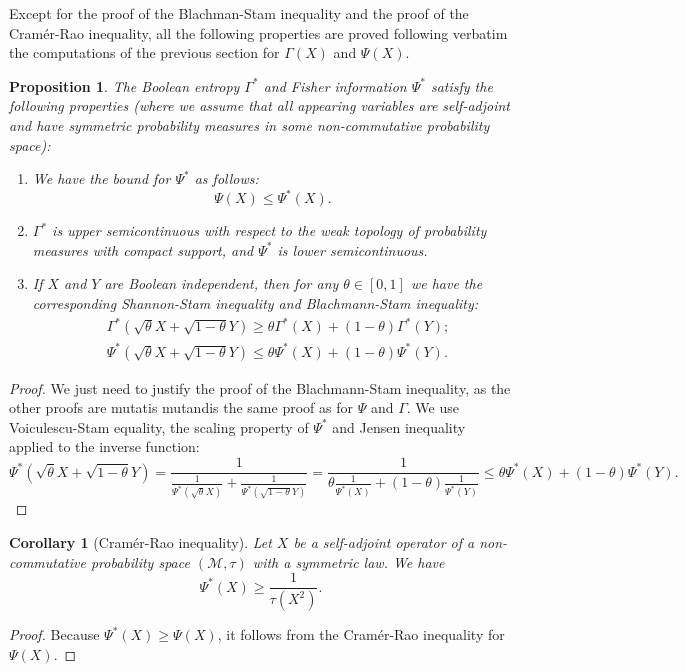 \documentclass[10pt, reqno]{amsart}
\numberwithin{equation}{section}
\theoremstyle{definition}
\theoremstyle{plain}
\newtheorem{proposition}[definition]{Proposition}
\newtheorem{corollary}[definition]{Corollary}
\theoremstyle{remark}
\newcommand{\1}{\mathbbm{1}}
\begin{document}
Except for the proof of the Blachman-Stam inequality and the proof of the Cramér-Rao inequality, all the following properties are proved following verbatim the computations of the previous section for $\Gamma(X)$ and $\Psi(X)$.
	\begin{proposition}\label{prop:Blachmann-Stam*}
	 	The Boolean entropy $\Gamma^*$ and Fisher information $\Psi^*$ satisfy the following properties  (where we assume that all appearing variables are self-adjoint and have symmetric probability measures in some non-commutative probability space):
	 	\begin{enumerate}
	 		\item We have the bound for $\Psi^*$ as follows:
	 		\begin{equation}\label{lowupboudnfisher*}
	 			 \Psi(X)\le \Psi^*(X).
	 		\end{equation}
	 		\item $\Gamma^*$ is upper semicontinuous with respect to the weak topology of probability measures with compact support, and $\Psi^*$ is lower semicontinuous.
	 		\item If $X$ and $Y$ are Boolean independent, then for any $\theta\in [0,1]$ we have the corresponding Shannon-Stam inequality and Blachmann-Stam inequality:
	 		\begin{align}
	 			&\Gamma^*(\sqrt{\theta}X + \sqrt{1-\theta}Y) \ge \theta\Gamma^*(X) + (1-\theta)\Gamma^*(Y)\label{SSI*};\\
	 			&\Psi^*(\sqrt{\theta}X + \sqrt{1-\theta}Y)\le \theta\Psi^*(X) + (1-\theta)\Psi^*(Y)\label{BSI*}.
	 		\end{align}
	 		
	 	\end{enumerate}
	\end{proposition}
	\begin{proof}We just need to justify the proof of the Blachmann-Stam inequality, as the other proofs are mutatis mutandis the same proof as for $\Psi$ and $\Gamma$. We use Voiculescu-Stam equality, the scaling property of $\Psi^*$ and Jensen inequality applied to the inverse function:
    	\begin{equation*}
		\Psi^*(\sqrt{\theta}X+\sqrt{1-\theta}Y)=\frac{1}{\frac{1}{\Psi^*(\sqrt{\theta}X)} + \frac{1}{\Psi^*(\sqrt{1-\theta}Y)}}=\frac{1}{\theta\frac{1}{\Psi^*(X)} + (1-\theta)\frac{1}{\Psi^*(Y)}}\leq \theta \Psi^*(X)+(1-\theta)\Psi^*(Y).
	\end{equation*}
	\end{proof}

	\begin{corollary}[Cramér-Rao inequality]Let $X$ be a self-adjoint operator of a non-commutative probability space $(\mathcal{M},\tau)$ with a symmetric law. We have
	\begin{equation}
		\Psi^*(X)\ge \frac{1}{\tau(X^2)}.
	\end{equation}
	\end{corollary}
	\begin{proof}
Because $\Psi^*(X)\ge \Psi(X)$, it follows from the Cramér-Rao inequality for $\Psi(X)$.
	\end{proof}
\end{document}
